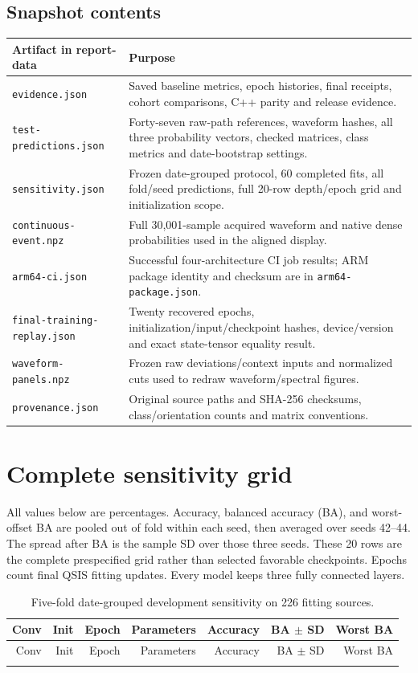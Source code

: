 \documentclass[a4paper,11pt,oneside]{article}
\newcommand{\code}[1]{\nolinkurl{#1}}
\begin{document}
\subsection{Snapshot contents}
\begin{longtable}{p{.35\linewidth}p{.59\linewidth}}
\toprule Artifact in report-data & Purpose \\\midrule\endhead
\code{evidence.json} & Saved baseline metrics, epoch histories, final receipts, cohort comparisons, C++ parity and release evidence. \\
\code{test-predictions.json} & Forty-seven raw-path references, waveform hashes, all three probability vectors, checked matrices, class metrics and date-bootstrap settings. \\
\code{sensitivity.json} & Frozen date-grouped protocol, 60 completed fits, all fold/seed predictions, full 20-row depth/epoch grid and initialization scope. \\
\code{continuous-event.npz} & Full 30,001-sample acquired waveform and native dense probabilities used in the aligned display. \\
\code{arm64-ci.json} & Successful four-architecture CI job results; ARM package identity and checksum are in \code{arm64-package.json}. \\
\code{final-training-replay.json} & Twenty recovered epochs, initialization/input/checkpoint hashes, device/version and exact state-tensor equality result. \\
\code{waveform-panels.npz} & Frozen raw deviations/context inputs and normalized cuts used to redraw waveform/spectral figures. \\
\code{provenance.json} & Original source paths and SHA-256 checksums, class/orientation counts and matrix conventions. \\
\bottomrule
\end{longtable}

\clearpage
\section{Complete sensitivity grid}\label{app:sensitivity-grid}
All values below are percentages. Accuracy, balanced accuracy (BA), and
worst-offset BA are pooled out of fold within each seed, then averaged over
seeds 42--44. The spread after BA is the sample SD over those three seeds.
These 20 rows are the complete prespecified grid rather than selected
favorable checkpoints. Epochs count final QSIS fitting updates. Every model
keeps three fully connected layers.
\begingroup\small
\begin{longtable}{rrrrrrr}
\caption{Five-fold date-grouped development sensitivity on 226 fitting sources.}\\
\toprule Conv & Init & Epoch & Parameters & Accuracy & BA $\pm$ SD & Worst BA \\\midrule\endfirsthead
\toprule Conv & Init & Epoch & Parameters & Accuracy & BA $\pm$ SD & Worst BA \\\midrule\endhead
\bottomrule\endfoot

\end{longtable}
\endgroup
\end{document}
